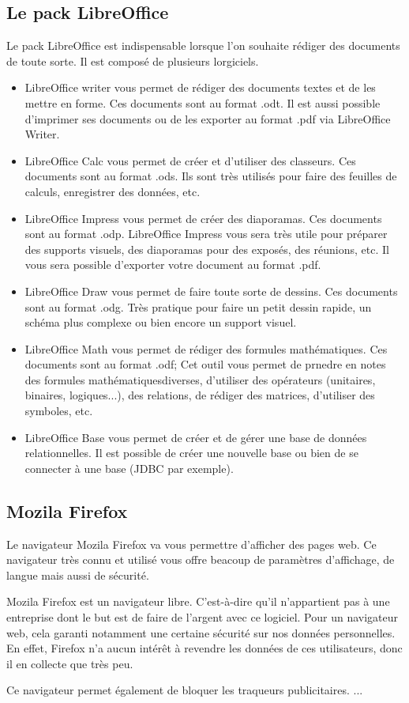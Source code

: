 \documentclass[12pt]{book}
\begin{document}
	\subsection{Le pack LibreOffice}
		Le pack LibreOffice est indispensable lorsque l'on souhaite rédiger des documents de toute sorte.\newline
		Il est composé de plusieurs lorgiciels.
		\begin{itemize}
			\item LibreOffice writer vous permet de rédiger des documents textes et de les mettre en forme.
			Ces documents sont au format .odt. 
			Il est aussi possible d'imprimer ses documents ou de les exporter au format .pdf via LibreOffice Writer.
			\item LibreOffice Calc vous permet de créer et d'utiliser des classeurs.
			Ces documents sont au format .ods. 
			Ils sont très utilisés pour faire des feuilles de calculs, enregistrer des données, etc.
			\item LibreOffice Impress vous permet de créer des diaporamas. 
			Ces documents sont au format .odp.
			LibreOffice Impress vous sera très utile pour préparer des supports visuels, des diaporamas pour des exposés, des réunions, etc.
			Il vous sera possible d'exporter votre document au format .pdf.
			\item LibreOffice Draw vous permet de faire toute sorte de dessins.
			Ces documents sont au format .odg.
			Très pratique pour faire un petit dessin rapide, un schéma plus complexe ou bien encore un support visuel.
			\item LibreOffice Math vous permet de rédiger des formules mathématiques.
			Ces documents sont au format .odf;
			Cet outil vous permet de prnedre en notes des formules mathématiquesdiverses, d'utiliser des opérateurs (unitaires, binaires, logiques...), des relations, de rédiger des matrices, d'utiliser des symboles, etc.
			\item LibreOffice Base vous permet de créer et de gérer une base de données relationnelles.
			Il est possible de créer une nouvelle base ou bien de se connecter à une base (JDBC par exemple). 
		\end{itemize}
	\subsection{Mozila Firefox}\label{sec:descfirefox}
		Le navigateur Mozila Firefox va vous permettre d'afficher des pages web.\newline
		Ce navigateur très connu et utilisé vous offre beacoup de paramètres d'affichage, de langue mais aussi de sécurité.\par
		Mozila Firefox est un navigateur libre.
		C'est-à-dire qu'il n'appartient pas à une entreprise dont le but est de faire de l'argent avec ce logiciel.
		Pour un navigateur web, cela garanti notamment une certaine sécurité sur nos données personnelles.
		En effet, Firefox n'a aucun intérêt à revendre les données de ces utilisateurs, donc il en collecte que très peu.\par
		Ce navigateur permet également de bloquer les traqueurs publicitaires.
		...
\end{document}
